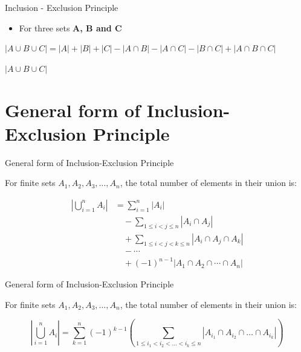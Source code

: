 \documentclass{beamer}
\begin{document}
\begin{frame}[fragile]{Inclusion - Exclusion Principle}
\begin{itemize}
\item For three sets \textbf{A, B and C}
\end{itemize}

\begin{center}
$ | A \cup B \cup C | = | A | + | B | + | C | - | A \cap B | - | A \cap C | - | B \cap C | + | A \cap B \cap C | $
\vspace{1em}
\
\setlength{\fboxsep}{8pt}
\\
\end{center}

\begin{center}
 {$ | A \cup B \cup C | $}   
\end{center}
\end{frame}

\section{General form of Inclusion-Exclusion Principle}
\begin{frame}{General form of Inclusion-Exclusion Principle}

For finite sets $A_1, A_2, A_3, \dots, A_n$, the total number of elements in their union is:
\vspace{0.5em}

\[ 
\begin{aligned}
\left\lvert \bigcup_{i=1}^{n} A_i \right\rvert &= \sum_{i=1}^{n} |A_i| \\
&\quad - \sum_{1 \le i < j \le n} |A_i \cap A_j| \\
&\quad + \sum_{1 \le i < j < k \le n} |A_i \cap A_j \cap A_k| \\
&\quad - \cdots \\
&\quad + (-1)^{n-1} |A_1 \cap A_2 \cap \cdots \cap A_n|
\end{aligned}
\] 

\end{frame}
\begin{frame}{General form of Inclusion-Exclusion Principle}

For finite sets $A_1, A_2, A_3, \dots, A_n$, the total number of elements in their union is:
\vspace{1em}

\[ 
\left\lvert \bigcup_{i=1}^{n} A_i \right\rvert = \sum_{k=1}^{n} (-1)^{k-1} \left( \sum_{1 \le i_1 < i_2 < \dots < i_k \le n} |A_{i_1} \cap A_{i_2} \cap \dots \cap A_{i_k}| \right)
\] 

\end{frame}
\end{document}
